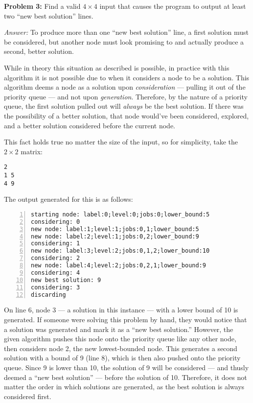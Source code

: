 \documentclass[11pt]{article}
\begin{document}
\textbf{Problem 3:} Find a valid $4 \times 4$ input that causes the program 
to output at least two ``new best solution'' lines.

\textit{Answer:} To produce more than one ``new best solution'' line, 
a first solution must be considered, but another node must look promising to 
and actually produce a second, better solution.

While in theory this situation as described is possible, in practice with 
this algorithm it is not possible due to when it considers a node to be a 
solution. This algorithm deems a node as a solution upon 
\textit{consideration} --- pulling it out of the priority queue --- and not 
upon \textit{generation}. Therefore, by the nature of a priority queue, the 
first solution pulled out will \textit{always} be the best solution. If there 
was the possibility of a better solution, that node would've been considered, 
explored, and a better solution considered before the current node.

This fact holds true no matter the size of the input, so for simplicity, 
take the $2 \times 2$ matrix:
\begin{Verbatim}[xleftmargin=5mm]
2
1 5
4 9
\end{Verbatim}
The output generated for this is as follows:
\begin{Verbatim}[numbers=left, xleftmargin=5mm]
starting node: label:0;level:0;jobs:0;lower_bound:5
considering: 0
new node: label:1;level:1;jobs:0,1;lower_bound:5
new node: label:2;level:1;jobs:0,2;lower_bound:9
considering: 1
new node: label:3;level:2;jobs:0,1,2;lower_bound:10
considering: 2
new node: label:4;level:2;jobs:0,2,1;lower_bound:9
considering: 4
new best solution: 9
considering: 3
discarding
\end{Verbatim}

On line 6, node 3 --- a solution in this instance --- with a lower 
bound of 10 is generated. If someone were solving this problem by hand, they 
would notice that a solution was generated and mark it as a ``new best 
solution.'' However, the given algorithm pushes this node onto the priority 
queue like any other node, then considers node 2, the new lowest-bounded 
node. This generates a second solution with a bound of 9 (line 8), which is 
then also pushed onto the priority queue. Since 9 is lower than 10, the 
solution of 9 will be considered --- and thusly deemed a ``new best 
solution'' --- before the solution of 10. Therefore, it does not matter the 
order in which solutions are generated, as the best solution is always 
considered first.
\end{document}

